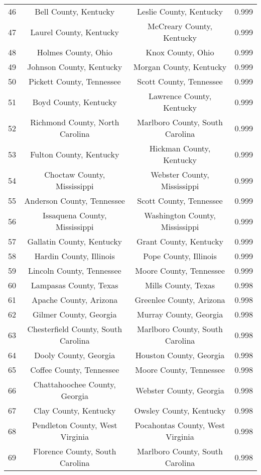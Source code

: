 \begin{longtable}{cccc}
  46 & Bell County, Kentucky & Leslie County, Kentucky & 0.999 \\ 
  47 & Laurel County, Kentucky & McCreary County, Kentucky & 0.999 \\ 
  48 & Holmes County, Ohio & Knox County, Ohio & 0.999 \\ 
  49 & Johnson County, Kentucky & Morgan County, Kentucky & 0.999 \\ 
  50 & Pickett County, Tennessee & Scott County, Tennessee & 0.999 \\ 
  51 & Boyd County, Kentucky & Lawrence County, Kentucky & 0.999 \\ 
  52 & Richmond County, North Carolina & Marlboro County, South Carolina & 0.999 \\ 
  53 & Fulton County, Kentucky & Hickman County, Kentucky & 0.999 \\ 
  54 & Choctaw County, Mississippi & Webster County, Mississippi & 0.999 \\ 
  55 & Anderson County, Tennessee & Scott County, Tennessee & 0.999 \\ 
  56 & Issaquena County, Mississippi & Washington County, Mississippi & 0.999 \\ 
  57 & Gallatin County, Kentucky & Grant County, Kentucky & 0.999 \\ 
  58 & Hardin County, Illinois & Pope County, Illinois & 0.999 \\ 
  59 & Lincoln County, Tennessee & Moore County, Tennessee & 0.999 \\ 
  60 & Lampasas County, Texas & Mills County, Texas & 0.998 \\ 
  61 & Apache County, Arizona & Greenlee County, Arizona & 0.998 \\ 
  62 & Gilmer County, Georgia & Murray County, Georgia & 0.998 \\ 
  63 & Chesterfield County, South Carolina & Marlboro County, South Carolina & 0.998 \\ 
  64 & Dooly County, Georgia & Houston County, Georgia & 0.998 \\ 
  65 & Coffee County, Tennessee & Moore County, Tennessee & 0.998 \\ 
  66 & Chattahoochee County, Georgia & Webster County, Georgia & 0.998 \\ 
  67 & Clay County, Kentucky & Owsley County, Kentucky & 0.998 \\ 
  68 & Pendleton County, West Virginia & Pocahontas County, West Virginia & 0.998 \\ 
  69 & Florence County, South Carolina & Marlboro County, South Carolina & 0.998 \\ 

\end{longtable}
